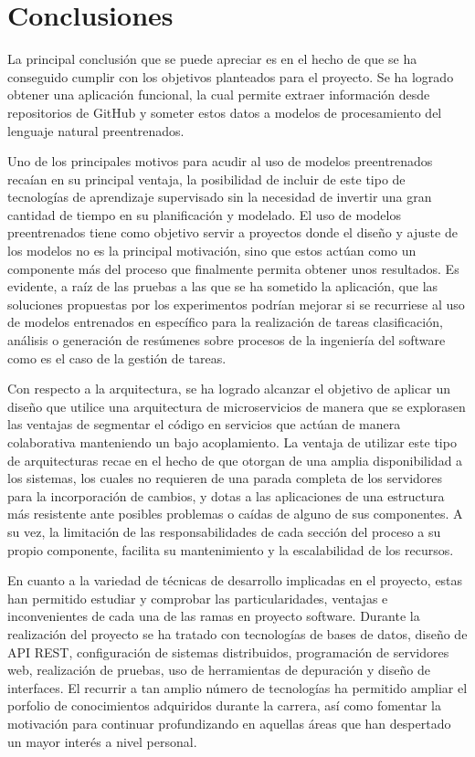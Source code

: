 
\section{Conclusiones}

La principal conclusión que se puede apreciar es en el hecho de que se ha conseguido cumplir con los objetivos planteados para el proyecto. Se ha logrado obtener una aplicación funcional, la cual permite extraer información desde repositorios de GitHub y someter estos datos a modelos de procesamiento del lenguaje natural preentrenados. 

Uno de los principales motivos para acudir al uso de modelos preentrenados recaían en su principal ventaja, la posibilidad de incluir de este tipo de tecnologías de aprendizaje supervisado sin la necesidad de invertir una gran cantidad de tiempo en su planificación y modelado. El uso de modelos preentrenados tiene como objetivo servir a proyectos donde el diseño y ajuste de los modelos no es la principal motivación, sino que estos actúan como un componente más del proceso que finalmente permita obtener unos resultados. Es evidente, a raíz de las pruebas a las que se ha sometido la aplicación, que las soluciones propuestas por los experimentos podrían mejorar si se recurriese al uso de modelos entrenados en específico para la realización de tareas clasificación, análisis o generación de resúmenes sobre procesos de la ingeniería del software como es el caso de la gestión de tareas.

Con respecto a la arquitectura, se ha logrado alcanzar el objetivo de aplicar un diseño que utilice una arquitectura de microservicios de manera que se explorasen las ventajas de segmentar el código en servicios que actúan de manera colaborativa manteniendo un bajo acoplamiento. La ventaja de utilizar este tipo de arquitecturas recae en el hecho de que otorgan de una amplia disponibilidad a los sistemas, los cuales no requieren de una parada completa de los servidores para la incorporación de cambios, y dotas a las aplicaciones de una estructura más resistente ante posibles problemas o caídas de alguno de sus componentes. A su vez, la limitación de las responsabilidades de cada sección del proceso a su propio componente, facilita su mantenimiento y la escalabilidad de los recursos.

En cuanto a la variedad de técnicas de desarrollo implicadas en el proyecto, estas han permitido estudiar y comprobar las particularidades, ventajas e inconvenientes de cada una de las ramas en proyecto software. Durante la realización del proyecto se ha tratado con tecnologías de bases de datos, diseño de API REST, configuración de sistemas distribuidos, programación de servidores web, realización de pruebas, uso de herramientas de depuración y diseño de interfaces. El recurrir a tan amplio número de tecnologías ha permitido ampliar el porfolio de conocimientos adquiridos durante la carrera, así como fomentar la motivación para continuar profundizando en aquellas áreas que han despertado un mayor interés a nivel personal.

